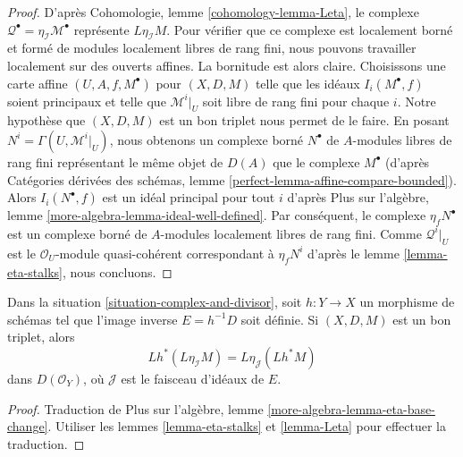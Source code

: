 \begin{proof}
D'après Cohomologie, lemme \ref{cohomology-lemma-Leta},
le complexe $\mathcal{Q}^\bullet = \eta_\mathcal{I}\mathcal{M}^\bullet$
représente $L\eta_\mathcal{I}M$. Pour vérifier que ce complexe
est localement borné et formé de modules localement libres de rang fini, nous pouvons travailler
localement sur des ouverts affines. La bornitude est alors claire.
Choisissons une carte affine $(U, A, f, M^\bullet)$ pour $(X, D, M)$
telle que les idéaux $I_i(M^\bullet, f)$ soient principaux et telle que
$\mathcal{M}^i|_U$ soit libre de rang fini pour chaque $i$. Notre hypothèse
que $(X, D, M)$ est un bon triplet nous permet de le faire. En posant
$N^i = \Gamma(U, \mathcal{M}^i|_U)$, nous obtenons un complexe borné
$N^\bullet$ de $A$-modules libres de rang fini représentant le
même objet de $D(A)$ que le complexe $M^\bullet$ (d'après
Catégories dérivées des schémas, lemme
\ref{perfect-lemma-affine-compare-bounded}).
Alors $I_i(N^\bullet, f)$ est un idéal principal pour tout $i$
d'après Plus sur l'algèbre, lemme \ref{more-algebra-lemma-ideal-well-defined}.
Par conséquent, le complexe $\eta_fN^\bullet$ est un complexe borné
de $A$-modules localement libres de rang fini. Comme
$\mathcal{Q}^i|_U$ est le $\mathcal{O}_U$-module quasi-cohérent
correspondant à $\eta_fN^i$ d'après le lemme \ref{lemma-eta-stalks}, nous concluons.
\end{proof}

\begin{lemma}
\label{lemma-complex-and-divisor-eta-pull}
Dans la situation \ref{situation-complex-and-divisor}, soit $h : Y \to X$
un morphisme de schémas tel que l'image inverse $E = h^{-1}D$
soit définie. Si $(X, D, M)$ est un bon triplet, alors
$$
Lh^*(L\eta_\mathcal{I}M) = L\eta_\mathcal{J}(Lh^*M)
$$
dans $D(\mathcal{O}_Y)$, où $\mathcal{J}$ est le faisceau d'idéaux de $E$.
\end{lemma}

\begin{proof}
Traduction de
Plus sur l'algèbre, lemme \ref{more-algebra-lemma-eta-base-change}.\newline
Utiliser les lemmes \ref{lemma-eta-stalks} et \ref{lemma-Leta}
pour effectuer la traduction.
\end{proof}


